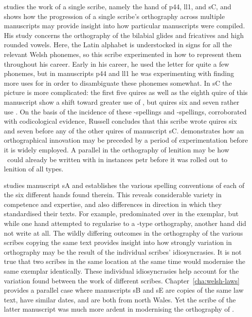 \Textcite{Rus_Orthography93} studies the work of a single scribe, namely the hand of \gls{p44}, \gls{ll1}, and \gls{sC}, and shows how the progression of a single scribe's orthography across multiple manuscripts may provide insight into how particular manuscripts were compiled. His study concerns the orthography of the bilabial glides and fricatives and high rounded vowels. Here, the Latin alphabet is understocked in signs for all the relevant Welsh phonemes, so this scribe experimented in how to represent them  throughout his career. Early in his career, he used the letter  for quite a few phonemes, but in manuscripts \gls{p44} and \gls{ll1} he was experimenting with finding more uses for  in order to disambiguate these phonemes somewhat. In \gls{sC} the picture is more complicated: the first five quires as well as the eighth quire of this manuscript show a shift toward greater use of , but quires six and seven rather use . On the basis of the incidence of these -spellings and -spellings, corroborated with codicological evidence, Russell concludes that this scribe wrote quires six and seven before any of the other quires of manuscript \gls{sC}. \Textcite{Rus_Orthography93} demonstrates how an orthographical innovation may be preceded by a period of experimentation before it is widely employed. A parallel in the orthography of lenition may be how \lT\ could already be written with  in instances \gls{petr} before it was rolled out to lenition of all types.

\Textcite{Rus_Scribal95} studies manuscript \gls{sA} and establishes the various spelling conventions of each of the six different hands found therein. This reveals considerable variety in competence and expertise, and also differences in direction in which they standardised their texts. For example,  predominated over  in the exemplar, but while one hand attempted to regularise to a -type orthography, another hand did not write  at all. 
The wildly differing outcomes in the orthography of the various scribes copying the same text provides insight into how strongly variation in orthography may be the result of the individual scribes' idiosyncrasies. It is not true that two scribes in the same location at the same time would modernise the same exemplar identically. These individual idiosyncrasies help account for the variation found between the work of different scribes. Chapter~\ref{cha:welsh-laws} provides a parallel case where manuscripts \gls{sB} and \gls{sE} are copies of the same law text, have similar dates, and are both from north Wales. Yet the scribe of the latter manuscript was much more ardent in modernising the orthography of \lT.

